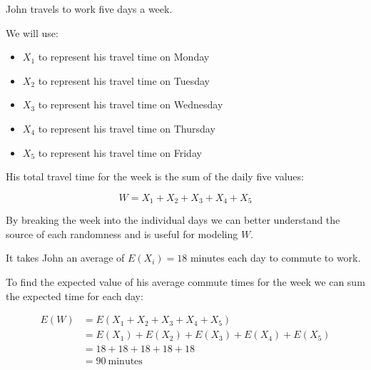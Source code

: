 \documentclass{beamer}
\begin{document}
\begin{frame}
\begin{example}\label{john travels}
\vspace{-2mm}%
John travels to work five days a week.\pause

\vspace{1mm}
We will use:
\begin{itemize}
\item $X_1$ to represent his travel time on Monday
\item $X_2$ to represent his travel time on Tuesday
\item $X_3$ to represent his travel time on Wednesday
\item $X_4$ to represent his travel time on Thursday
\item $X_5$ to represent his travel time on Friday
\end{itemize}\pause
His total travel time for the week is the sum of the daily five values:

\vspace{-3mm}
\begin{equation*}
W = X_1+X_2+X_3+X_4+X_5
\end{equation*}
\end{example}\pause

\begin{note}
By breaking the week into the individual days we can better understand the source of each randomness and is useful for modeling $W$.
\end{note}
\end{frame}

\begin{frame}
\begin{example}
It takes John an average of $E(X_i)=18$ minutes each day to commute to work.\pause

\vspace{1mm}
To find the expected value of his average commute times for the week we can sum the expected time for each day:

\vspace{-3mm}
\begin{equation*}
\begin{aligned}
E(W) &= E(X_1+X_2+X_3+X_4+X_5) \\
&= E(X_1)+E(X_2)+E(X_3)+E(X_4)+E(X_5) \\
&= 18 + 18 + 18 + 18 + 18 \\
&= 90~\text{minutes}
\end{aligned}
\end{equation*}\pause

\vspace{1mm}
\pause
{}
\end{example}
\end{frame}
\end{document}
